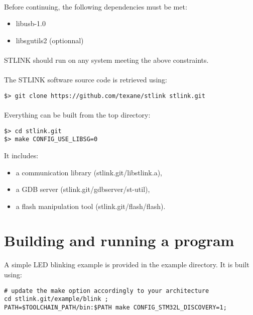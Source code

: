 \documentclass[a4paper, 11pt]{article}
\begin{document}
\paragraph{}
Before continuing, the following dependencies must be met:
\begin{itemize}
\item libusb-1.0
\item libsgutils2 (optionnal)
\end{itemize}

\paragraph{}
STLINK should run on any system meeting the above constraints.

\paragraph{}
The STLINK software source code is retrieved using:\\
\begin{small}
\begin{lstlisting}[frame=tb]
$> git clone https://github.com/texane/stlink stlink.git
\end{lstlisting}
\end{small}

\paragraph{}
Everything can be built from the top directory:\\
\begin{small}
\begin{lstlisting}[frame=tb]
$> cd stlink.git
$> make CONFIG_USE_LIBSG=0
\end{lstlisting}
\end{small}
It includes:
\begin{itemize}
\item a communication library (stlink.git/libstlink.a),
\item a GDB server (stlink.git/gdbserver/st-util),
\item a flash manipulation tool (stlink.git/flash/flash).
\end{itemize}


\newpage

\section{Building and running a program}
A simple LED blinking example is provided in the example directory. It is built using:\\
\begin{small}
\begin{lstlisting}[frame=tb]
# update the make option accordingly to your architecture
cd stlink.git/example/blink ;
PATH=$TOOLCHAIN_PATH/bin:$PATH make CONFIG_STM32L_DISCOVERY=1;
\end{lstlisting}
\end{small}
\end{document}
